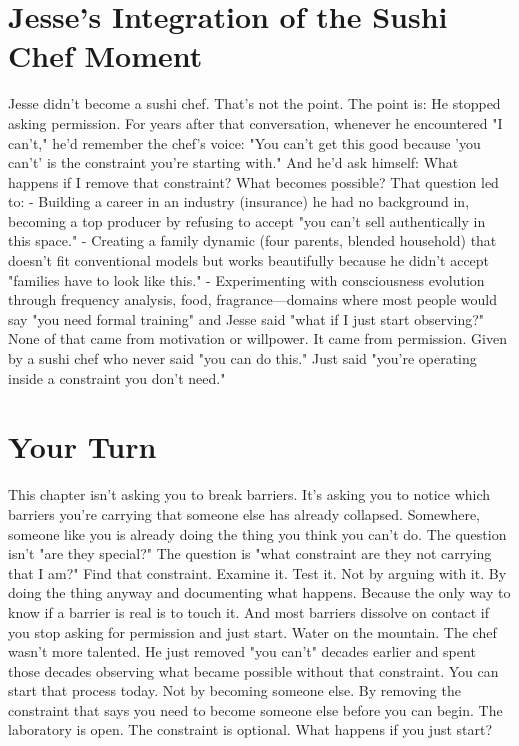 \section{Jesse's Integration of the Sushi Chef Moment}

Jesse didn't become a sushi chef. That's not the point.
The point is: He stopped asking permission.
For years after that conversation, whenever he encountered "I can't," he'd remember the chef's voice: "You can't get this good because 'you can't' is the constraint you're starting with."
And he'd ask himself: What happens if I remove that constraint? What becomes possible?
That question led to:
- Building a career in an industry (insurance) he had no background in, becoming a top producer by refusing to accept "you can't sell authentically in this space."
- Creating a family dynamic (four parents, blended household) that doesn't fit conventional models but works beautifully because he didn't accept "families have to look like this."
- Experimenting with consciousness evolution through frequency analysis, food, fragrance—domains where most people would say "you need formal training" and Jesse said "what if I just start observing?"
None of that came from motivation or willpower.
It came from permission. Given by a sushi chef who never said "you can do this." Just said "you're operating inside a constraint you don't need."

\section{Your Turn}

This chapter isn't asking you to break barriers. It's asking you to notice which barriers you're carrying that someone else has already collapsed.
Somewhere, someone like you is already doing the thing you think you can't do.
The question isn't "are they special?" The question is "what constraint are they not carrying that I am?"
Find that constraint. Examine it. Test it.
Not by arguing with it. By doing the thing anyway and documenting what happens.
Because the only way to know if a barrier is real is to touch it. And most barriers dissolve on contact if you stop asking for permission and just start.
Water on the mountain.
The chef wasn't more talented. He just removed "you can't" decades earlier and spent those decades observing what became possible without that constraint.
You can start that process today.
Not by becoming someone else. By removing the constraint that says you need to become someone else before you can begin.
The laboratory is open. The constraint is optional.
What happens if you just start?

